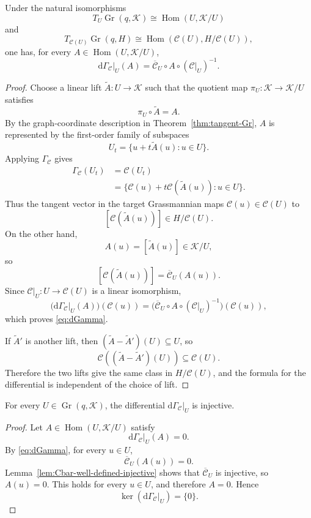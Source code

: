 \documentclass{siamonline250211}
\newcommand{\Gr}{\operatorname{Gr}}
\newcommand{\Hom}{\operatorname{Hom}}
\newcommand{\cK}{\mathcal K}
\newcommand{\cC}{\mathcal C}
\newcommand{\dd}{\mathrm d}
\begin{document}
\begin{proposition}\label{prop:dGamma}
Under the natural isomorphisms
\[
  T_U\Gr(q,\cK)\cong\Hom(U,\cK/U)
\]
and
\[
  T_{\cC(U)}\Gr(q,H)
  \cong\Hom(\cC(U),H/\cC(U)),
\]
one has, for every $A\in\Hom(U,\cK/U)$,
\begin{equation}\label{eq:dGamma}
  \dd\Gamma_{\cC}|_U(A)
  =\overline{\cC}_U\circ A\circ(\cC|_U)^{-1}.
\end{equation}
\end{proposition}

\begin{proof}
Choose a linear lift $\widetilde A:U\to\cK$ such that the quotient map
$\pi_U:\cK\to\cK/U$ satisfies
\[
  \pi_U\circ\widetilde A=A.
\]
By the graph-coordinate description in Theorem~\ref{thm:tangent-Gr}, $A$ is
represented by the first-order family of subspaces
\[
  U_t=\{u+t\widetilde A(u):u\in U\}.
\]
Applying $\Gamma_{\cC}$ gives
\[
\begin{aligned}
  \Gamma_{\cC}(U_t)
  &=\cC(U_t)\\
  &=\{\cC(u)+t\cC(\widetilde A(u)):u\in U\}.
\end{aligned}
\]
Thus the tangent vector in the target Grassmannian maps
$\cC(u)\in\cC(U)$ to
\[
  [\cC(\widetilde A(u))]\in H/\cC(U).
\]
On the other hand,
\[
  A(u)=[\widetilde A(u)]\in\cK/U,
\]
so
\[
  [\cC(\widetilde A(u))]
  =\overline{\cC}_U(A(u)).
\]
Since $\cC|_U:U\to\cC(U)$ is a linear isomorphism,
\[
  \bigl(\dd\Gamma_{\cC}|_U(A)\bigr)(\cC(u))
  =\bigl(\overline{\cC}_U\circ A\circ(\cC|_U)^{-1}\bigr)(\cC(u)),
\]
which proves \eqref{eq:dGamma}.

If $\widetilde A'$ is another lift, then
$(\widetilde A-\widetilde A')(U)\subseteq U$, so
\[
  \cC((\widetilde A-\widetilde A')(U))\subseteq\cC(U).
\]
Therefore the two lifts give the same class in $H/\cC(U)$, and the formula for
the differential is independent of the choice of lift.
\end{proof}

\begin{corollary}\label{cor:dGamma-injective}
For every $U\in\Gr(q,\cK)$, the differential
$\dd\Gamma_{\cC}|_U$ is injective.
\end{corollary}

\begin{proof}
Let $A\in\Hom(U,\cK/U)$ satisfy
\[
  \dd\Gamma_{\cC}|_U(A)=0.
\]
By \eqref{eq:dGamma}, for every $u\in U$,
\[
  \overline{\cC}_U(A(u))=0.
\]
Lemma~\ref{lem:Cbar-well-defined-injective} shows that
$\overline{\cC}_U$ is injective, so $A(u)=0$. This holds for every $u\in U$,
and therefore $A=0$. Hence
\[
  \ker(\dd\Gamma_{\cC}|_U)=\{0\}.
\]
\end{proof}
\end{document}
